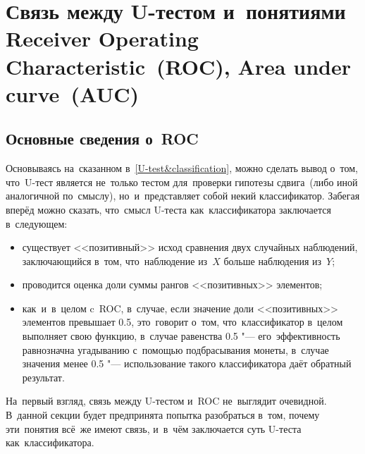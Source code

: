 \documentclass[]{scrreprt}
\begin{document}
\section{Связь между U-тестом и~понятиями \foreignlanguage{english}{Receiver Operating Characteristic~(ROC), Area under curve~(AUC)}}\label{U-AUC}
%
\subsection{Основные сведения о~ROC}
Основываясь на~сказанном в~\ref{U-test&classification}, можно сделать вывод о~том, что~U-тест является не~только тестом для~проверки гипотезы сдвига~(либо иной аналогичной по~смыслу), но~и~представляет собой некий классификатор. Забегая вперёд можно сказать, что~смысл U-теста как~классификатора заключается в~следующем:
\begin{itemize}
	\item существует <<позитивный>> исход сравнения двух случайных наблюдений, заключающийся в~том, что~наблюдение из~$X$ больше наблюдения из~$Y$;
	\item проводится оценка доли суммы рангов <<позитивных>> элементов;
	\item как~и~в~целом c~ROC, в~случае, если значение доли <<позитивных>> элементов превышает 0.5, это~говорит о~том, что~классификатор в~целом выполняет свою функцию, в~случае равенства 0.5 "--- его~эффективность равнозначна угадыванию с~помощью подбрасывания монеты, в~случае значения менее 0.5 "--- использование такого классификатора даёт обратный результат.	 
\end{itemize}
На~первый взгляд, связь между U-тестом и~ROC не~выглядит очевидной. В~данной секции будет предпринята попытка разобраться в~том, почему эти~понятия всё~же имеют связь, и~в~чём заключается суть U-теста как~классификатора.
\end{document}
